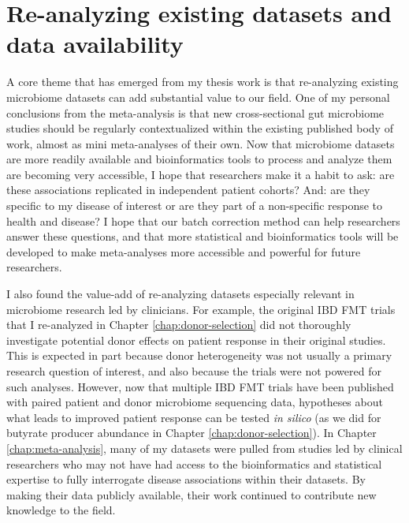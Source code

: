 \section{Re-analyzing existing datasets and data availability}

A core theme that has emerged from my thesis work is that re-analyzing existing microbiome datasets can add substantial value to our field.
One of my personal conclusions from the meta-analysis is that new cross-sectional gut microbiome studies should be regularly contextualized within the existing published body of work, almost as mini meta-analyses of their own.
Now that microbiome datasets are more readily available and bioinformatics tools to process and analyze them are becoming very accessible, I hope that researchers make it a habit to ask: are these associations replicated in independent patient cohorts? And: are they specific to my disease of interest or are they part of a non-specific response to health and disease?
I hope that our batch correction method can help researchers answer these questions, and that more statistical and bioinformatics tools will be developed to make meta-analyses more accessible and powerful for future researchers.

I also found the value-add of re-analyzing datasets especially relevant in microbiome research led by clinicians.
For example, the original IBD FMT trials that I re-analyzed in Chapter \ref{chap:donor-selection} did not thoroughly investigate potential donor effects on patient response in their original studies.
This is expected in part because donor heterogeneity was not usually a primary research question of interest, and also because the trials were not powered for such analyses.
However, now that multiple IBD FMT trials have been published with paired patient and donor microbiome sequencing data, hypotheses about what leads to improved patient response can be tested \textit{in silico} (as we did for butyrate producer abundance in Chapter \ref{chap:donor-selection}).
In Chapter \ref{chap:meta-analysis}, many of my datasets were pulled from studies led by clinical researchers who may not have had access to the bioinformatics and statistical expertise to fully interrogate disease associations within their datasets.
By making their data publicly available, their work continued to contribute new knowledge to the field.

